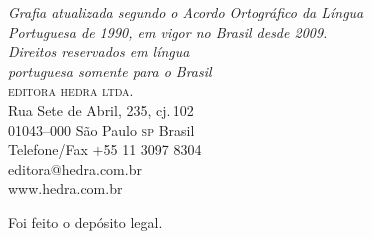 \vfill

\textit{Grafia atualizada segundo o Acordo Ortográfico da Língua\\
Portuguesa de 1990, em vigor no Brasil desde 2009.}\\

\textit{Direitos reservados em língua\\
portuguesa somente para o Brasil}\\

\textsc{editora hedra ltda.}\\
Rua Sete de Abril, 235, cj.\,102\\
01043--000 São Paulo \textsc{sp} Brasil\\
Telefone/Fax +55 11 3097 8304\\\smallskip
editora@hedra.com.br\\
www.hedra.com.br\\
\bigskip

Foi feito o depósito legal.

\endgroup
\pagebreak